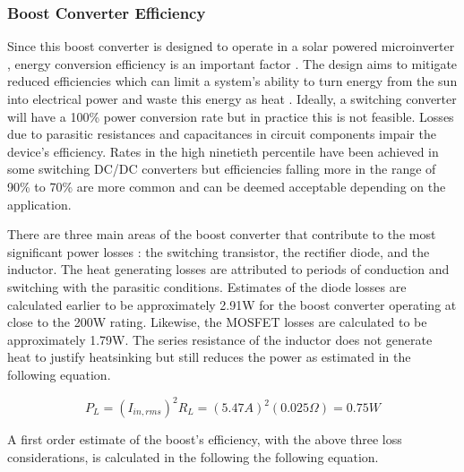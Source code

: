 \subsubsection{Boost Converter Efficiency}
Since this boost converter is designed to operate in a solar powered microinverter , energy conversion efficiency is an important factor . The design aims to mitigate reduced efficiencies which can limit a system's ability to turn energy from the sun into electrical power and waste this energy as heat . Ideally, a switching converter will have a 100\% power conversion rate but in practice this is not feasible. Losses due to parasitic resistances and capacitances in circuit components impair the device's efficiency. Rates in the high ninetieth percentile have been achieved in some switching DC/DC converters but efficiencies falling more in the range of 90\% to 70\% are more common and can be deemed acceptable depending on the application. 

There are three main areas of the boost converter that contribute to the most significant power losses : the switching transistor, the rectifier diode, and the inductor. The heat generating losses are attributed to periods of conduction and switching with the parasitic conditions. Estimates of the diode losses are calculated earlier to be approximately 2.91W for the boost converter operating at close to the 200W rating. Likewise, the MOSFET losses are calculated to be approximately 1.79W. The series resistance of the inductor does not generate heat to justify heatsinking but still reduces the power as estimated in the following equation.

\begin{equation}
P_L = (I_{in,rms})^2R_L = (5.47A)^2(0.025\Omega) = 0.75W 
\end{equation}


A first order estimate of the boost's efficiency, with the above three loss considerations, is calculated in the following the following equation.

